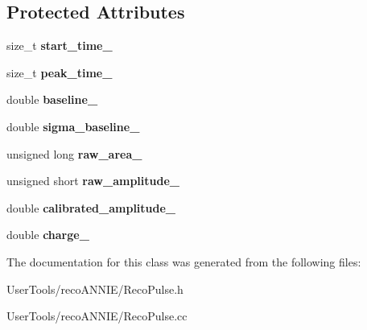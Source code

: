 \subsection*{Protected Attributes}
\begin{DoxyCompactItemize}
\item 
\hypertarget{classannie_1_1RecoPulse_a6090760e41716137b9c3819a420d5eb8}{
size\_\-t {\bfseries start\_\-time\_\-}}
\label{classannie_1_1RecoPulse_a6090760e41716137b9c3819a420d5eb8}

\item 
\hypertarget{classannie_1_1RecoPulse_a6e94108b50a882445fe12c2ec25c74f9}{
size\_\-t {\bfseries peak\_\-time\_\-}}
\label{classannie_1_1RecoPulse_a6e94108b50a882445fe12c2ec25c74f9}

\item 
\hypertarget{classannie_1_1RecoPulse_ad4fa13a9012a2dfb87cefea9bb72233b}{
double {\bfseries baseline\_\-}}
\label{classannie_1_1RecoPulse_ad4fa13a9012a2dfb87cefea9bb72233b}

\item 
\hypertarget{classannie_1_1RecoPulse_afb08d645128d1180dfd22c56764902b6}{
double {\bfseries sigma\_\-baseline\_\-}}
\label{classannie_1_1RecoPulse_afb08d645128d1180dfd22c56764902b6}

\item 
\hypertarget{classannie_1_1RecoPulse_a1d6a1ab357584189eac4c703a2b2b5ae}{
unsigned long {\bfseries raw\_\-area\_\-}}
\label{classannie_1_1RecoPulse_a1d6a1ab357584189eac4c703a2b2b5ae}

\item 
\hypertarget{classannie_1_1RecoPulse_a5b65f34b0033c820b2b4482701147c78}{
unsigned short {\bfseries raw\_\-amplitude\_\-}}
\label{classannie_1_1RecoPulse_a5b65f34b0033c820b2b4482701147c78}

\item 
\hypertarget{classannie_1_1RecoPulse_afaab45c845391574f35c93aec9c1f34a}{
double {\bfseries calibrated\_\-amplitude\_\-}}
\label{classannie_1_1RecoPulse_afaab45c845391574f35c93aec9c1f34a}

\item 
\hypertarget{classannie_1_1RecoPulse_a29f9e86d00bc1b0d415f27fcbd739596}{
double {\bfseries charge\_\-}}
\label{classannie_1_1RecoPulse_a29f9e86d00bc1b0d415f27fcbd739596}

\end{DoxyCompactItemize}


The documentation for this class was generated from the following files:\begin{DoxyCompactItemize}
\item 
UserTools/recoANNIE/RecoPulse.h\item 
UserTools/recoANNIE/RecoPulse.cc\end{DoxyCompactItemize}
